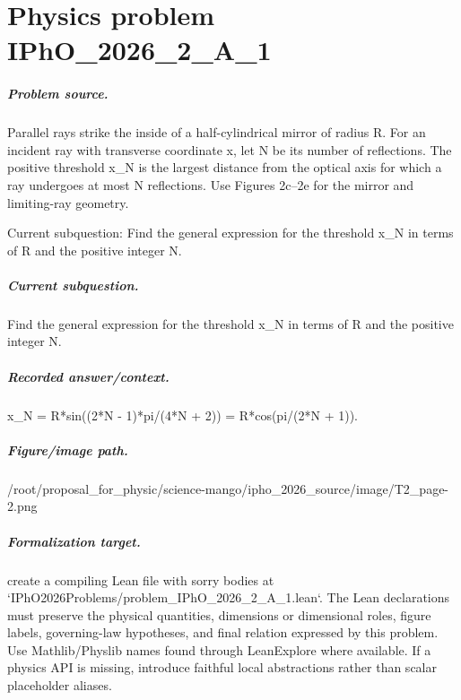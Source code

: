 
\chapter{Physics problem IPhO\_2026\_2\_A\_1}
\label{ch:IPhO2026Problems_problem_IPhO_2026_2_A_1}

\paragraph{Problem source.}
Parallel rays strike the inside of a half-cylindrical mirror of radius R.  For
an incident ray with transverse coordinate x, let N be its number of
reflections.  The positive threshold x\_N is the largest distance from the
optical axis for which a ray undergoes at most N reflections.  Use Figures
2c--2e for the mirror and limiting-ray geometry.

Current subquestion:
Find the general expression for the threshold x\_N in terms of R and the positive integer N.

\paragraph{Current subquestion.}
Find the general expression for the threshold x\_N in terms of R and the positive integer N.

\paragraph{Recorded answer/context.}
x\_N = R*sin((2*N - 1)*pi/(4*N + 2)) = R*cos(pi/(2*N + 1)).

\paragraph{Figure/image path.}
/root/proposal\_for\_physic/science-mango/ipho\_2026\_source/image/T2\_page-2.png

\paragraph{Formalization target.}
create a compiling Lean file with sorry bodies at `IPhO2026Problems/problem\_IPhO\_2026\_2\_A\_1.lean`. The Lean declarations must preserve the physical quantities, dimensions or dimensional roles, figure labels, governing-law hypotheses, and final relation expressed by this problem.
Use Mathlib/Physlib names found through LeanExplore where available. If a physics API is missing, introduce faithful local abstractions rather than scalar placeholder aliases.

